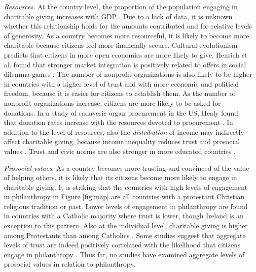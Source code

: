 \documentclass[twocolumn, serif, rga, numeric]{jote-article}
\begin{document}
\emph{Resources}. At the country level, the proportion of the population engaging in charitable giving increases with GDP \cite{CharitableGivingFoundation2010, Bekkers2016a}. Due to a lack of data, it is unknown whether this relationship holds for the amounts contributed and for relative levels of generosity.
As a country becomes more resourceful, it is likely to become more charitable because citizens feel more financially secure. Cultural evolutionism predicts that citizens in more open economies are more likely to give. Henrich et al. found that stronger market integration is positively related to offers in social dilemma games \cite{Henrich2005}. The number of nonprofit organizations is also likely to be higher in countries with a higher level of trust and with more economic and political freedom, because it is easier for citizens to establish them. As the number of nonprofit organizations increase, citizens are more likely to be asked for donations. In a study of cadaveric organ procurement in the US, Healy found that donation rates increase with the resources devoted to procurement \cite{Healy2004}. In addition to the level of resources, also the \emph{distribution} of income may indirectly affect charitable giving, because income inequality reduces trust \cite{Uslaner2010} and prosocial values \cite{Paskov2012}. Trust and civic norms are also stronger in more educated countries \cite{Campbell2006}.

\emph{Prosocial values}. As a country becomes more trusting and convinced of the value of helping others, it is likely that its citizens become more likely to engage in charitable giving. It is striking that the countries with high levels of engagement in philanthropy in Figure \ref{fig:map} are all countries with a protestant Christian religious tradition or past. Lower levels of engagement in philanthropy are found in countries with a Catholic majority where trust is lower, though Ireland is an exception to this pattern. Also at the individual level, charitable giving is higher among Protestants than among Catholics \cite{Bekkers2011b}. Some studies suggest that aggregate levels of trust are indeed positively correlated with the likelihood that citizens engage in philanthropy \cite{Glanville2016, Evers2011}. Thus far, no studies have examined aggregate levels of prosocial values in relation to philanthropy.
\end{document}

